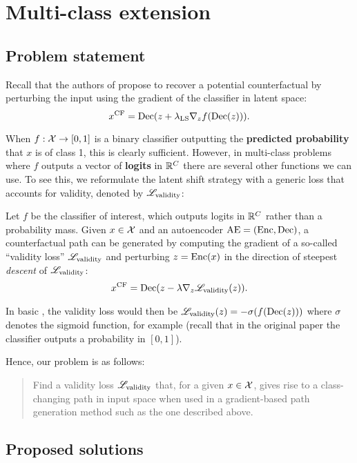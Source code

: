 \documentclass[../main.tex]{subfiles}
\begin{document}
\section{Multi-class extension}

\subsection{Problem statement}

Recall that the authors of \ls{} propose to recover a potential counterfactual by perturbing the input using the gradient of the classifier in latent space:
\begin{equation*}
    x^\mathrm{CF} = \operatorname{Dec}(z + \lambda_\text{LS} \nabla_z f(\operatorname{Dec}(z))).
\end{equation*}

When $f: \mathcal{X} \to [0, 1]$ is a binary classifier outputting the \textbf{predicted probability} that $x$ is of class 1, this is clearly sufficient.
However, in multi-class problems where $f$ outputs a vector of \textbf{logits} in $\mathbb{R}^C$ there are several other functions we can use.
To see this, we reformulate the latent shift strategy with a generic loss that accounts for validity, denoted by $\mathscr{L}_\text{validity}$:

Let $f$ be the classifier of interest, which outputs logits in $\mathbb{R}^C$ rather than a probability mass.
Given $x \in \mathcal{X}$ and an autoencoder $\mathrm{AE} = (\operatorname{Enc}, \operatorname{Dec})$, a counterfactual path can be generated by computing the gradient of a so-called ``validity loss'' $\mathscr{L}_\text{validity}$ and perturbing $z = \operatorname{Enc}(x)$ in the direction of steepest \emph{descent} of $\mathscr{L}_\text{validity}$:
\begin{equation*}
x^\mathrm{CF} = \operatorname{Dec}(z - \lambda \nabla_z \mathscr{L}_\text{validity}(z)).
\end{equation*}

In basic \ls{}, the validity loss would then be $\mathscr{L}_\text{validity}(z) = - \sigma(f(\operatorname{Dec}(z)))$ where $\sigma$ denotes the sigmoid function, for example (recall that in the original paper
the classifier outputs a probability in $[0, 1]$).

Hence, our problem is as follows:
\begin{quote}
Find a validity loss $\mathscr{L}_\text{validity}$ that, for a given $x \in \mathcal{X}$, gives rise to a class-changing path in input space when used in a gradient-based path generation method such as the one described above.
\end{quote}

\subsection{Proposed solutions}
\label{sec:validity_losses}
\end{document}

